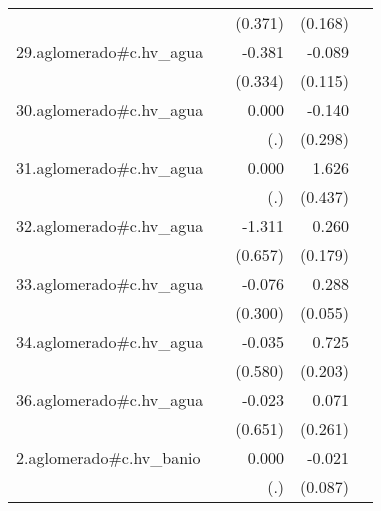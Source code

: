 {\begin{longtable}{l*{4}{D{.}{.}{-1}}}
            &                     &     (0.371)         &     (0.168)         &                     \\
\addlinespace
29.aglomerado#c.hv\_agua&                     &      -0.381         &      -0.089         &                     \\
            &                     &     (0.334)         &     (0.115)         &                     \\
\addlinespace
30.aglomerado#c.hv\_agua&                     &       0.000         &      -0.140         &                     \\
            &                     &         (.)         &     (0.298)         &                     \\
\addlinespace
31.aglomerado#c.hv\_agua&                     &       0.000         &       1.626\sym{***}&                     \\
            &                     &         (.)         &     (0.437)         &                     \\
\addlinespace
32.aglomerado#c.hv\_agua&                     &      -1.311\sym{*}  &       0.260         &                     \\
            &                     &     (0.657)         &     (0.179)         &                     \\
\addlinespace
33.aglomerado#c.hv\_agua&                     &      -0.076         &       0.288\sym{***}&                     \\
            &                     &     (0.300)         &     (0.055)         &                     \\
\addlinespace
34.aglomerado#c.hv\_agua&                     &      -0.035         &       0.725\sym{***}&                     \\
            &                     &     (0.580)         &     (0.203)         &                     \\
\addlinespace
36.aglomerado#c.hv\_agua&                     &      -0.023         &       0.071         &                     \\
            &                     &     (0.651)         &     (0.261)         &                     \\
\addlinespace
2.aglomerado#c.hv\_banio&                     &       0.000         &      -0.021         &                     \\
            &                     &         (.)         &     (0.087)         &                     \\

\end{longtable}}
